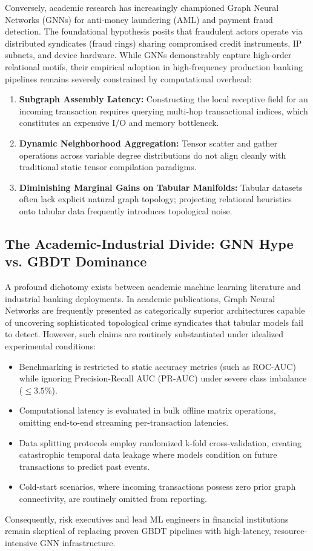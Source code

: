 \documentclass[11pt,a4paper]{report}
\begin{document}
Conversely, academic research has increasingly championed Graph Neural Networks (GNNs) \cite{hamilton2017inductive,wang2019semi} for anti-money laundering (AML) and payment fraud detection. The foundational hypothesis posits that fraudulent actors operate via distributed syndicates (fraud rings) sharing compromised credit instruments, IP subnets, and device hardware. While GNNs demonstrably capture high-order relational motifs, their empirical adoption in high-frequency production banking pipelines remains severely constrained by computational overhead:
\begin{enumerate}[leftmargin=*]
    \item \textbf{Subgraph Assembly Latency:} Constructing the local receptive field for an incoming transaction requires querying multi-hop transactional indices, which constitutes an expensive I/O and memory bottleneck.
    \item \textbf{Dynamic Neighborhood Aggregation:} Tensor scatter and gather operations across variable degree distributions do not align cleanly with traditional static tensor compilation paradigms.
    \item \textbf{Diminishing Marginal Gains on Tabular Manifolds:} Tabular datasets often lack explicit natural graph topology; projecting relational heuristics onto tabular data frequently introduces topological noise.
\end{enumerate}

\subsection{The Academic-Industrial Divide: GNN Hype vs. GBDT Dominance}
A profound dichotomy exists between academic machine learning literature and industrial banking deployments. In academic publications, Graph Neural Networks are frequently presented as categorically superior architectures capable of uncovering sophisticated topological crime syndicates that tabular models fail to detect. However, such claims are routinely substantiated under idealized experimental conditions:
\begin{itemize}
    \item Benchmarking is restricted to static accuracy metrics (such as ROC-AUC) while ignoring Precision-Recall AUC (PR-AUC) under severe class imbalance ($\leq 3.5\%$).
    \item Computational latency is evaluated in bulk offline matrix operations, omitting end-to-end streaming per-transaction latencies.
    \item Data splitting protocols employ randomized k-fold cross-validation, creating catastrophic temporal data leakage where models condition on future transactions to predict past events.
    \item Cold-start scenarios, where incoming transactions possess zero prior graph connectivity, are routinely omitted from reporting.
\end{itemize}
Consequently, risk executives and lead ML engineers in financial institutions remain skeptical of replacing proven GBDT pipelines with high-latency, resource-intensive GNN infrastructure.
\end{document}
